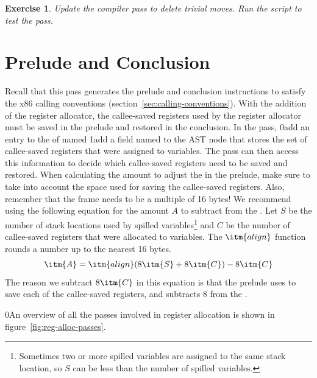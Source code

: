 \documentclass[7x10]{TimesAPriori_MIT}%
\def\racketEd{0}
\def\pythonEd{1}
\def\edition{1}
\newcommand{\racket}[1]{{\if\edition\racketEd{#1}\fi}}
\newcommand{\pythonColor}[0]{}
\newcommand{\python}[1]{{\if\edition\pythonEd\pythonColor #1\fi}}
\newtheorem{exercise}[theorem]{Exercise}
\numberwithin{theorem}{chapter}
\numberwithin{definition}{chapter}
\numberwithin{equation}{chapter}
\begin{document}
\begin{exercise}\normalfont\normalsize
%
Update the  compiler pass to delete trivial moves.
%
%
Run the script to test the  pass.
\end{exercise}


\section{Prelude and Conclusion}
\label{sec:print-x86-reg-alloc}

Recall that this pass generates the prelude and conclusion
instructions to satisfy the x86 calling conventions
(section~\ref{sec:calling-conventions}). With the addition of the
register allocator, the callee-saved registers used by the register
allocator must be saved in the prelude and restored in the conclusion.
In the  pass,
%
\racket{add an entry to the 
  of  named }
%
\python{add a field named \code{used\_callee} to the \code{X86Program} AST node}
%
that stores the set of callee-saved registers that were assigned to
variables. The  pass can then access
this information to decide which callee-saved registers need to be
saved and restored.
%
When calculating the amount to adjust the  in the prelude,
make sure to take into account the space used for saving the
callee-saved registers. Also, remember that the frame needs to be a
multiple of 16 bytes! We recommend using the following equation for
the amount $A$ to subtract from the . Let $S$ be the number
of stack locations used by spilled variables\footnote{Sometimes two or
  more spilled variables are assigned to the same stack location, so
  $S$ can be less than the number of spilled variables.} and $C$ be
the number of callee-saved registers that were
allocated to
variables. The $\itm{align}$ function rounds a number up to the
nearest 16 bytes.
\[
   \itm{A} = \itm{align}(8\itm{S} + 8\itm{C}) - 8\itm{C}
\]
The reason we subtract $8\itm{C}$ in this equation is that the
prelude uses  to save each of the callee-saved registers,
and  subtracts $8$ from the .

\racket{An overview of all the passes involved in register
  allocation is shown in figure~\ref{fig:reg-alloc-passes}.}
\end{document}
